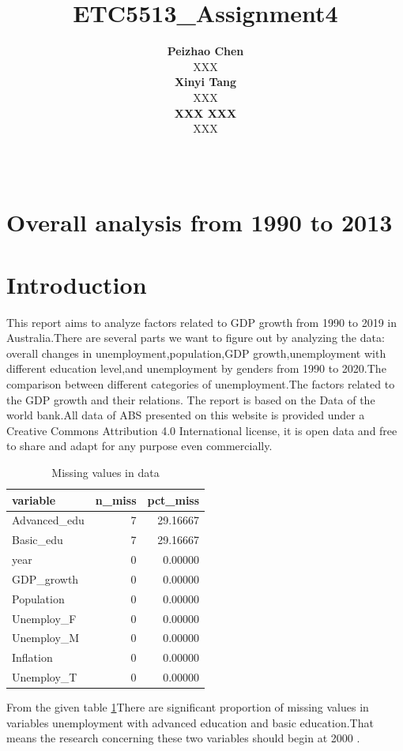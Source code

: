 \documentclass[11pt,a4paper,]{article}
\title{ETC5513\_Assignment4}
\author{\sf\Large\textbf{ Peizhao Chen}\\ {\sf\large XXX\\[0.5cm]} \sf\Large\textbf{ Xinyi Tang}\\ {\sf\large XXX\\[0.5cm]} \sf\Large\textbf{ XXX XXX}\\ {\sf\large XXX\\[0.5cm]}}
\date{\sf\Date~\Month~\Year}
\makeatletter
\def\titlepage{\front{\expandafter{\@title}}{\@author}{\@organization}}
\makeatother
\begin{document}
\titlepage

\section*{Overall analysis from 1990 to 2013}

\hypertarget{introduction}{%
\section{Introduction}\label{introduction}}

This report aims to analyze factors related to GDP growth from 1990 to 2019 in Australia.There are several parts we want to figure out by analyzing the data: overall changes in unemployment,population,GDP growth,unemployment with different education level,and unemployment by genders from 1990 to 2020.The comparison between different categories of unemployment.The factors related to the GDP growth and their relations.
The report is based on the Data of the world bank.All data of ABS presented on this website is provided under a Creative Commons Attribution 4.0 International license, it is open data and free to share and adapt for any purpose even commercially.

\begin{table}[H]

\caption{\label{tab:m1}Missing values in data}
\centering
\begin{tabular}[t]{lrr}
\toprule
variable & n\_miss & pct\_miss\\
\midrule
Advanced\_edu & 7 & 29.16667\\
Basic\_edu & 7 & 29.16667\\
year & 0 & 0.00000\\
GDP\_growth & 0 & 0.00000\\
Population & 0 & 0.00000\\
\addlinespace
Unemploy\_F & 0 & 0.00000\\
Unemploy\_M & 0 & 0.00000\\
Inflation & 0 & 0.00000\\
Unemploy\_T & 0 & 0.00000\\
\bottomrule
\end{tabular}
\end{table}

From the given table \ref{tab:m1}There are significant proportion of missing values in variables unemployment with advanced education and basic education.That means the research concerning these two variables should begin at 2000 .
\end{document}
